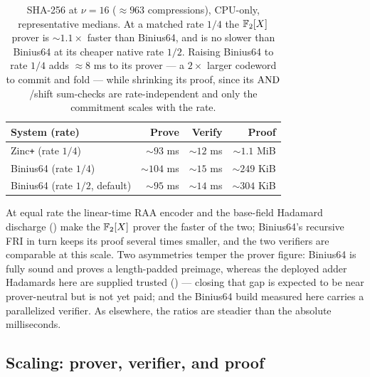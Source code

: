 \begin{table}[h]
\centering
\renewcommand{\arraystretch}{1.2}
\begin{tabular}{l r r r}
\toprule
System (rate) & Prove & Verify & Proof \\
\midrule
Zinc\texttt{+} (rate $1/4$) & $\sim\!93$ ms & $\sim\!12$ ms & $\sim\!1.1$ MiB \\
Binius64 (rate $1/4$) & $\sim\!104$ ms & $\sim\!15$ ms & $\sim\!249$ KiB \\
Binius64 (rate $1/2$, default) & $\sim\!95$ ms & $\sim\!14$ ms & $\sim\!304$ KiB \\
\bottomrule
\end{tabular}
\caption{SHA-256 at $\nu=16$ ($\approx\!963$ compressions), CPU-only,
representative medians. At a matched rate $1/4$ the $\mathbb{F}_2[X]$ prover is
$\sim\!1.1\times$ faster than Binius64, and is no slower than Binius64 at
its cheaper native rate $1/2$. Raising Binius64 to rate $1/4$ adds $\approx\!8$ ms to its prover ---
a $2\times$ larger codeword to commit and fold --- while shrinking its
proof, since its $\operatorname{AND}$/shift sum-checks are rate-independent and only the
commitment scales with the rate.}
\label{tab:binius-rate}
\end{table}

\begin{remark}
\label{rem:binius-read}
At equal rate the linear-time RAA encoder and the base-field Hadamard
discharge () make the $\mathbb{F}_2[X]$ prover the faster
of the two; Binius64's recursive FRI in turn keeps its proof several times
smaller, and the two verifiers are comparable at this scale. Two
asymmetries temper the prover figure: Binius64 is fully sound and proves a
length-padded preimage, whereas the deployed adder Hadamards here are
supplied trusted () --- closing that gap is
expected to be near prover-neutral but is not yet paid; and the Binius64
build measured here carries a parallelized verifier. As elsewhere, the
ratios are steadier than the absolute milliseconds.
\end{remark}

\subsection{Scaling: prover, verifier, and proof}
\label{sec:impl-scaling}\label{sec:res-scaling}

